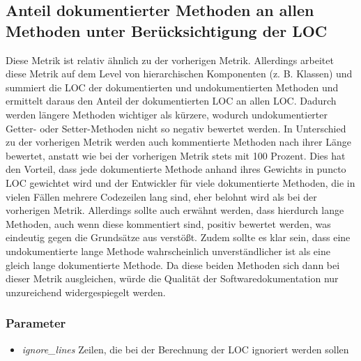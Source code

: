  \subsection{Anteil dokumentierter Methoden an allen Methoden unter Berücksichtigung der LOC}\label{chapter:metrics_loc_ratio}
Diese Metrik ist relativ ähnlich zu der vorherigen Metrik. Allerdings arbeitet diese Metrik auf dem Level von hierarchischen Komponenten (z. B. Klassen) und summiert die \ac{LOC} der dokumentierten und undokumentierten Methoden und ermittelt daraus den Anteil der dokumentierten \ac{LOC} an allen \ac{LOC}. Dadurch werden längere Methoden wichtiger als kürzere, wodurch undokumentierter Getter- oder Setter-Methoden nicht so negativ bewertet werden. In Unterschied zu der vorherigen Metrik werden auch kommentierte Methoden nach ihrer Länge bewertet, anstatt wie bei der vorherigen Metrik stets mit 100 Prozent. Dies hat den Vorteil, dass jede dokumentierte Methode anhand ihres Gewichts in puncto \ac{LOC} gewichtet wird und der Entwickler für viele dokumentierte Methoden, die in vielen Fällen mehrere Codezeilen lang sind, eher belohnt wird als bei der vorherigen Metrik. Allerdings sollte auch erwähnt werden, dass hierdurch lange Methoden, auch wenn diese kommentiert sind, positiv bewertet werden, was eindeutig gegen die Grundsätze aus \cite[S. 34]{martin2009clean} verstößt. Zudem sollte es klar sein, dass eine undokumentierte lange Methode wahrscheinlich unverständlicher ist als eine gleich lange dokumentierte Methode. Da diese beiden Methoden sich dann bei dieser Metrik ausgleichen, würde die Qualität der Softwaredokumentation nur unzureichend widergespiegelt werden.
  \subsubsection{Parameter}
  \begin{itemize}
     \item \textit{ignore\_lines} Zeilen, die bei der Berechnung der \ac{LOC} ignoriert werden sollen
 \end{itemize}
 